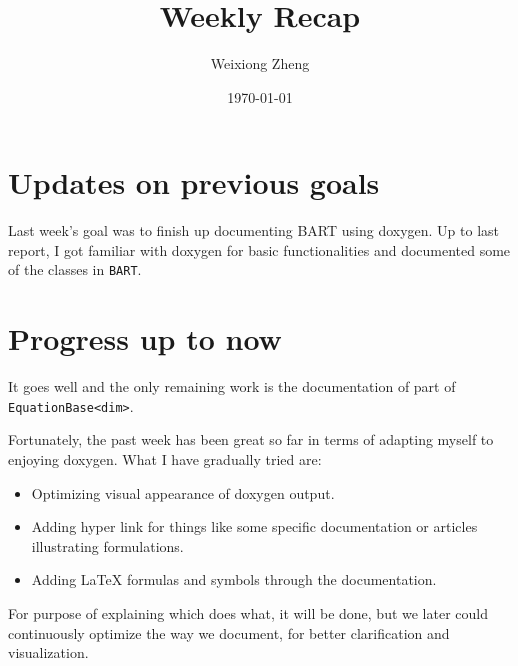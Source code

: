 \documentclass{article}
\title{Weekly Recap} %
\author{Weixiong Zheng} %
\date{\today} %
\begin{document}
\maketitle %

\section{Updates on previous goals}
Last week's goal was to finish up documenting BART using doxygen. Up to last report,
I got familiar with doxygen for basic functionalities and documented some of the classes
in {\tt BART}.

\section{Progress up to now}
It goes well and the only remaining work is the documentation of part of {\tt EquationBase<dim>}.

Fortunately, the past week has been great so far in terms of adapting myself to enjoying
doxygen. What I have gradually tried are:
\begin{itemize}
	\item Optimizing visual appearance of doxygen output.
	\item Adding hyper link for things like some specific documentation or articles illustrating formulations.
	\item Adding LaTeX formulas and symbols through the documentation.
\end{itemize}

For purpose of explaining which does what, it will be done, but we later could continuously optimize the
way we document, for better clarification and visualization.

\end{document}
